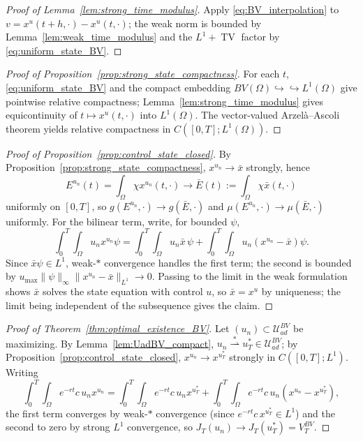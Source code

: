 \documentclass[pdflatex,sn-mathphys-num]{sn-jnl}
\newcommand{\Om}{\Omega}
\newcommand{\UadBV}{\mathcal{U}_{ad}^{BV}}
\DeclareMathOperator{\TV}{TV}
\theoremstyle{plain}
\theoremstyle{definition}
\theoremstyle{remark}
\begin{document}
\begin{proof}[Proof of Lemma~\ref{lem:strong_time_modulus}]
Apply \eqref{eq:BV_interpolation} to $v=x^u(t+h,\cdot)-x^u(t,\cdot)$; the weak norm
is bounded by Lemma~\ref{lem:weak_time_modulus} and the $L^1+\TV$ factor by
\eqref{eq:uniform_state_BV}.
\end{proof}

\begin{proof}[Proof of Proposition~\ref{prop:strong_state_compactness}]
For each $t$, \eqref{eq:uniform_state_BV} and the compact embedding
$BV(\Om)\hookrightarrow\hookrightarrow L^1(\Om)$ give pointwise relative
compactness; Lemma~\ref{lem:strong_time_modulus} gives equicontinuity of
$t\mapsto x^u(t,\cdot)$ into $L^1(\Om)$. The vector-valued Arzel\`a--Ascoli theorem
yields relative compactness in $C([0,T];L^1(\Om))$.
\end{proof}

\begin{proof}[Proof of Proposition~\ref{prop:control_state_closed}]
By Proposition~\ref{prop:strong_state_compactness}, $x^{u_n}\to\bar x$ strongly,
hence
\[
E^{u_n}(t)=\int_\Om\chi x^{u_n}(t,\cdot)
\longrightarrow
\bar E(t):=\int_\Om\chi\bar x(t,\cdot)
\]
uniformly on $[0,T]$, so $g(E^{u_n},\cdot)\to g(\bar E,\cdot)$ and
$\mu(E^{u_n},\cdot)\to\mu(\bar E,\cdot)$ uniformly. For the bilinear term, write,
for bounded $\psi$,
\[
\int_0^T\!\!\int_\Om u_n x^{u_n}\psi
=
\int_0^T\!\!\int_\Om u_n\bar x\,\psi
+\int_0^T\!\!\int_\Om u_n(x^{u_n}-\bar x)\psi.
\]
Since $\bar x\psi\in L^1$, weak-$\ast$ convergence handles the first term; the
second is bounded by $u_{\max}\|\psi\|_\infty\|x^{u_n}-\bar x\|_{L^1}\to0$. Passing
to the limit in the weak formulation shows $\bar x$ solves the state equation with
control $u$, so $\bar x=x^u$ by uniqueness; the limit being independent of the
subsequence gives the claim.
\end{proof}

\begin{proof}[Proof of Theorem~\ref{thm:optimal_existence_BV}]
Let $(u_n)\subset\UadBV$ be maximizing. By Lemma~\ref{lem:UadBV_compact},
$u_n\overset{\ast}{\rightharpoonup}u_T^*\in\UadBV$; by
Proposition~\ref{prop:control_state_closed}, $x^{u_n}\to x^{u_T^*}$ strongly in
$C([0,T];L^1)$. Writing
\[
\int_0^T\!\!\int_\Om e^{-rt}c\,u_n x^{u_n}
=\int_0^T\!\!\int_\Om e^{-rt}c\,u_n x^{u_T^*}
+\int_0^T\!\!\int_\Om e^{-rt}c\,u_n(x^{u_n}-x^{u_T^*}),
\]
the first term converges by weak-$\ast$ convergence (since
$e^{-rt}c\,x^{u_T^*}\in L^1$) and the second to zero by strong $L^1$ convergence,
so $J_T(u_n)\to J_T(u_T^*)=V_T^{BV}$.
\end{proof}
\end{document}
